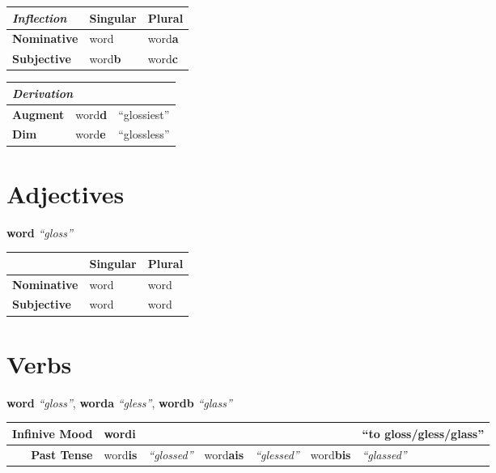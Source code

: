 \begin{center}
\begin{tabular}{|l|l|l|}\hline
\textit{Inflection}&\textbf{Singular}&\textbf{Plural}\\\hline
\textbf{Nominative}&word&word\textbf{a}\\\hline
\textbf{Subjective}&word\textbf{b}&word\textbf{c}\\\hline
\end{tabular}

\begin{tabular}{|l|l|l|}\hline
\multicolumn{3}{|l|}{\textit{Derivation}}\\\hline
\textbf{Augment}&word\textbf{d}&``glossiest''\\\hline
\textbf{Dim}&word\textbf{e}&``glossless''\\\hline
\end{tabular}
\end{center}

\section{Adjectives}

\textbf{word} \textit{``gloss''}

\begin{center}
\begin{tabular}{|l|l|l|}\hline
&\textbf{Singular}&\textbf{Plural}\\\hline
\textbf{Nominative}&word&word\\\hline
\textbf{Subjective}&word&word\\\hline
\end{tabular}
\end{center}

\section{Verbs}

\textbf{word} \textit{``gloss''}, \textbf{worda} \textit{``gless''}, \textbf{wordb} \textit{``glass''}

\begin{center}
\begin{tabular}{|r|l|l|l|l|l|l|}\hline
\textbf{Infinive Mood}&\multicolumn{5}{|l|}{word\textbf{i}}&``to gloss/gless/glass'' \\\hline
\textbf{Past Tense}&word\textbf{is}&\textit{``glossed''}&word\textbf{ais}&\textit{``glessed''}&word\textbf{bis}&\textit{``glassed''}\\\hline
\end{tabular}
\end{center}

